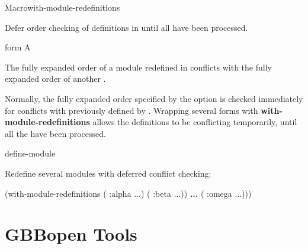 \documentclass[10pt,twoside,english,pdftex]{article}
\begin{document}
\begin{functiondoc}{Macro}{with-module-redefinitions}%
  {\superstar} 
%
%
%

\fnsyntax 

\fnpurpose Defer  order checking of 
definitions in  until all  have been processed.

\fnpackage {}

\fnmodule {}

\fnargs
\begin{args}{form}
\arg[form] A 
\end{args}

\fnerrors The fully expanded  order of a module
redefined in  conflicts with the fully expanded
 order of another .

\fndescription Normally, the fully expanded  order
specified by the  option is checked immediately for conflicts
with previously defined  by \textbf{}.
Wrapping several \textbf{} forms with
\textbf{with-module-redefinitions} allows the definitions to be conflicting
temporarily, until all the  have been processed.

\begin{alsos}{define-module}
\end{alsos}

\fnexample
{}%
Redefine several modules with deferred conflict checking:
%
\W\supp
\begin{example}
  (with-module-redefinitions
    ( :alpha \textrm{...})
    ( :beta \textrm{...}))
            \textbf{...}
    ( :omega \textrm{...})))
\end{example}

\end{functiondoc}


\T\markright{}%
\T\pagestyle{plain}
\T\cleardoublepage
\W{}
\T\pagestyle{fancy}
\T\thispagestyle{fancybottom}
\T\global\def\fnlastname{ }%
\T\renewcommand{\headrulewidth}{0pt}
\section{GBBopen Tools}
\end{document}
